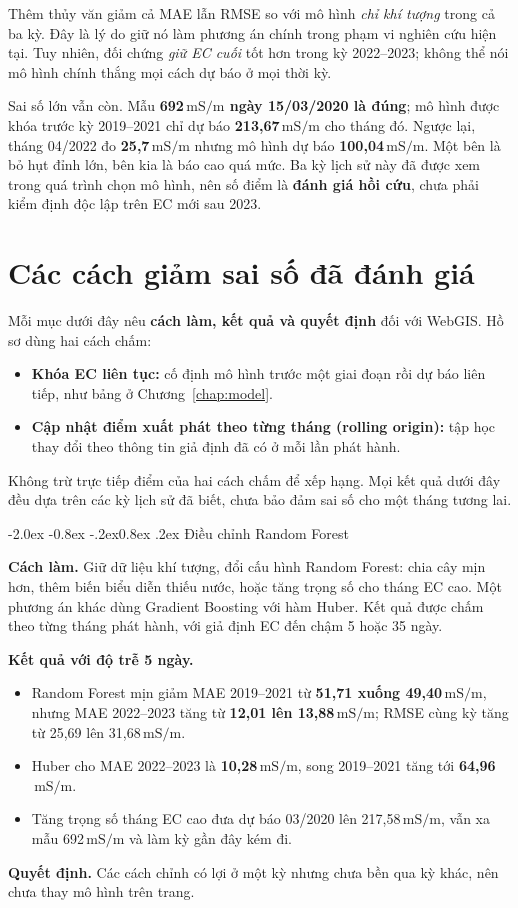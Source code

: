 \documentclass[12pt,a4paper,oneside]{report}
\makeatletter
\newcommand{\ms}{\ensuremath{\,\mathrm{mS/m}}}
\renewcommand\section{\@startsection{section}{1}{\z@}%
  {-2.0ex \@plus -0.8ex \@minus -.2ex}{0.8ex \@plus .2ex}%
  {\normalfont\large\bfseries\color{mainteal}}}
\makeatother
\begin{document}
Thêm thủy văn giảm cả MAE lẫn RMSE so với mô hình \emph{chỉ khí tượng} trong cả ba kỳ. Đây là lý do giữ nó làm phương án chính trong phạm vi nghiên cứu hiện tại. Tuy nhiên, đối chứng \emph{giữ EC cuối} tốt hơn trong kỳ 2022--2023; không thể nói mô hình chính thắng mọi cách dự báo ở mọi thời kỳ.

Sai số lớn vẫn còn. Mẫu \textbf{692\ms{} ngày 15/03/2020 là đúng}; mô hình được khóa trước kỳ 2019--2021 chỉ dự báo \textbf{213,67\ms} cho tháng đó. Ngược lại, tháng 04/2022 đo \textbf{25,7\ms} nhưng mô hình dự báo \textbf{100,04\ms}. Một bên là bỏ hụt đỉnh lớn, bên kia là báo cao quá mức. Ba kỳ lịch sử này đã được xem trong quá trình chọn mô hình, nên số điểm là \textbf{đánh giá hồi cứu}, chưa phải kiểm định độc lập trên EC mới sau 2023.

\chapter{Các cách giảm sai số đã đánh giá}

Mỗi mục dưới đây nêu \textbf{cách làm, kết quả và quyết định} đối với WebGIS. Hồ sơ dùng hai cách chấm:
\begin{itemize}
  \item \textbf{Khóa EC liên tục:} cố định mô hình trước một giai đoạn rồi dự báo liên tiếp, như bảng ở Chương~\ref{chap:model}.
  \item \textbf{Cập nhật điểm xuất phát theo từng tháng (rolling origin):} tập học thay đổi theo thông tin giả định đã có ở mỗi lần phát hành.
\end{itemize}
Không trừ trực tiếp điểm của hai cách chấm để xếp hạng. Mọi kết quả dưới đây đều dựa trên các kỳ lịch sử đã biết, chưa bảo đảm sai số cho một tháng tương lai.

\section{Điều chỉnh Random Forest}

\textbf{Cách làm.} Giữ dữ liệu khí tượng, đổi cấu hình Random Forest: chia cây mịn hơn, thêm biến biểu diễn thiếu nước, hoặc tăng trọng số cho tháng EC cao. Một phương án khác dùng Gradient Boosting với hàm Huber. Kết quả được chấm theo từng tháng phát hành, với giả định EC đến chậm 5 hoặc 35 ngày.

\textbf{Kết quả với độ trễ 5 ngày.}
\begin{itemize}
  \item Random Forest mịn giảm MAE 2019--2021 từ \textbf{51,71 xuống 49,40\ms}, nhưng MAE 2022--2023 tăng từ \textbf{12,01 lên 13,88\ms}; RMSE cùng kỳ tăng từ 25,69 lên 31,68\ms.
  \item Huber cho MAE 2022--2023 là \textbf{10,28\ms}, song 2019--2021 tăng tới \textbf{64,96\ms}.
  \item Tăng trọng số tháng EC cao đưa dự báo 03/2020 lên 217,58\ms, vẫn xa mẫu 692\ms{} và làm kỳ gần đây kém đi.
\end{itemize}
\textbf{Quyết định.} Các cách chỉnh có lợi ở một kỳ nhưng chưa bền qua kỳ khác, nên chưa thay mô hình trên trang.
\end{document}
